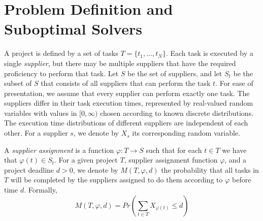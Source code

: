 \documentclass[letterpaper]{article} %
\newcommand\Roni[1]{\nb{\textbf{Roni:}}{blue}{#1}}
\begin{document}
\section{Problem Definition and Suboptimal Solvers}
\label{sec:def}

A project is defined by a set of tasks $T=\{t_1,\ldots, t_N\}$.
Each task is executed by a single \emph{supplier}, but there may be multiple suppliers that have the required proficiency to perform that task.
Let $S$ be the set of suppliers, and let $S_t$ be the subset of $S$ that consists of all suppliers that 
can perform the task $t$. For ease of presentation, we assume that every supplier can perform exactly one task. The suppliers differ in their task execution times, represented by real-valued random variables with values in $[0, \infty)$ chosen according to known discrete distributions. The execution time distributions of different suppliers are independent of each other. For a supplier $s$, we denote by $X_s$ its corresponding random variable.

A \emph{supplier assignment} is a function $\varphi: T\rightarrow S$ such that for each $t\in T$ we have that  $\varphi(t)\in S_t$.
For a given project $T$, supplier assignment function $\varphi$, and a project deadline $d>0$, we denote by 
$M(T, \varphi, d)$ the probability that 
all tasks in $T$ will be completed by the suppliers assigned to do them according to $\varphi$ before time $d$. Formally, 
\begin{equation}
M(T, \varphi, d) = Pr\left(\sum_{t\in T} X_{\varphi(t)}\leq d\right) 
 \label{eq:objective}
\end{equation}
\end{document}
